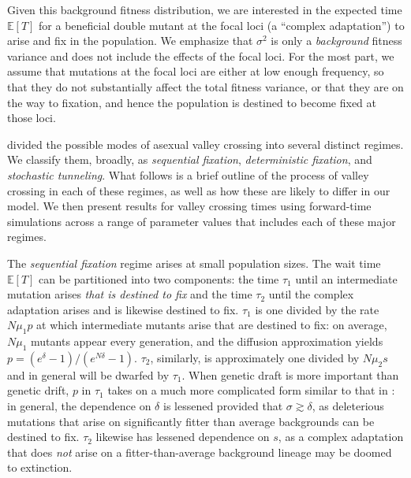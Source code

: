 \documentclass[10pt,twocolumn,twoside]{gsajnl}
\begin{document}
\begin{spacing}{1.5}
Given this background fitness distribution, we are interested in the expected time $\mathbb{E}\left[ T\right]$ for a beneficial double mutant at the focal loci (a ``complex adaptation'') to arise and fix in the population.
We emphasize that $\sigma^2$ is only a \emph{background} fitness variance and does not include the effects of the focal loci.
For the most part, we assume that mutations at the focal loci are either at low enough frequency, so that they do not substantially affect the total fitness variance, or that they are on the way to fixation, and hence the population is destined to become fixed at those loci.

\citet{weissman_2009} divided the possible modes of asexual valley crossing into several distinct regimes.
We classify them, broadly, as \emph{sequential fixation}, \emph{deterministic fixation}, and \emph{stochastic tunneling}.
What follows is a brief outline of the process of valley crossing in each of these regimes, as well as how these are likely to differ in our model.
We then present results for valley crossing times using forward-time simulations across a range of parameter values that includes each of these major regimes.

The \emph{sequential fixation} regime arises at small population sizes.
The wait time $\mathbb{E}\left[ T\right]$ can be partitioned into two components: the time $\tau_1$ until an intermediate mutation arises \emph{that is destined to fix} and the time $\tau_2$ until the complex adaptation arises and is likewise destined to fix.
$\tau_1$ is one divided by the rate $N\mu_1 p$ at which intermediate mutants arise that are destined to fix: on average, $N\mu_1$ mutants appear every generation, and the diffusion approximation yields $p = (e^\delta - 1)/(e^{N\delta} - 1)$.
$\tau_2$, similarly, is approximately one divided by $N\mu_2 s$ and in general will be dwarfed by $\tau_1$.
When genetic draft is more important than genetic drift, $p$ in $\tau_1$ takes on a much more complicated form similar to that in \citet{good_2014}: in general, the dependence on $\delta$ is lessened provided that $\sigma \gtrsim \delta$, as deleterious mutations that arise on significantly fitter than average backgrounds can be destined to fix.
$\tau_2$ likewise has lessened dependence on $s$, as a complex adaptation that does \emph{not} arise on a fitter-than-average background lineage may be doomed to extinction.


\end{spacing}
\end{document}
